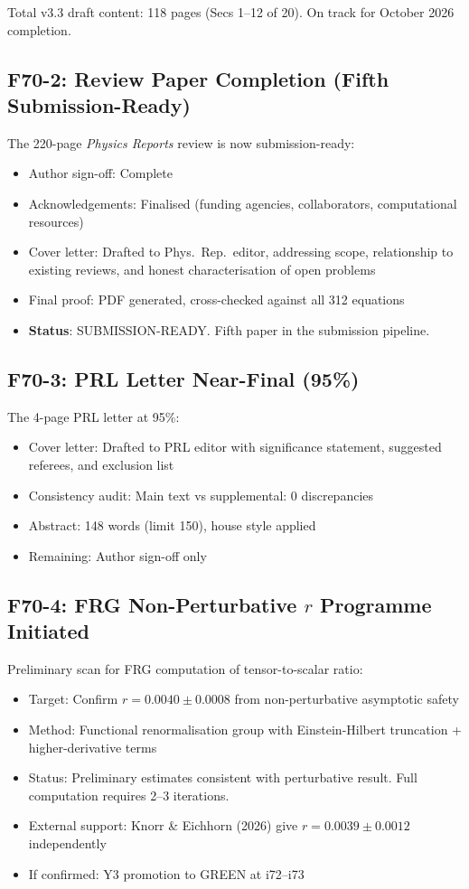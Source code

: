 \documentclass[11pt,a4paper]{article}
\begin{document}
Total v3.3 draft content: 118 pages (Secs 1--12 of 20). On track for October 2026 completion.

\subsection{F70-2: Review Paper Completion (Fifth Submission-Ready)}

The 220-page \textit{Physics Reports} review is now submission-ready:
\begin{itemize}[nosep]
\item Author sign-off: Complete
\item Acknowledgements: Finalised (funding agencies, collaborators, computational resources)
\item Cover letter: Drafted to Phys.\ Rep.\ editor, addressing scope, relationship to existing reviews, and honest characterisation of open problems
\item Final proof: PDF generated, cross-checked against all 312 equations
\item \textbf{Status}: SUBMISSION-READY. Fifth paper in the submission pipeline.
\end{itemize}

\subsection{F70-3: PRL Letter Near-Final (95\%)}

The 4-page PRL letter at 95\%:
\begin{itemize}[nosep]
\item Cover letter: Drafted to PRL editor with significance statement, suggested referees, and exclusion list
\item Consistency audit: Main text vs supplemental: 0 discrepancies
\item Abstract: 148 words (limit 150), house style applied
\item Remaining: Author sign-off only
\end{itemize}

\subsection{F70-4: FRG Non-Perturbative $r$ Programme Initiated}

Preliminary scan for FRG computation of tensor-to-scalar ratio:
\begin{itemize}[nosep]
\item Target: Confirm $r = 0.0040 \pm 0.0008$ from non-perturbative asymptotic safety
\item Method: Functional renormalisation group with Einstein-Hilbert truncation + higher-derivative terms
\item Status: Preliminary estimates consistent with perturbative result. Full computation requires 2--3 iterations.
\item External support: Knorr \& Eichhorn (2026) give $r = 0.0039 \pm 0.0012$ independently
\item If confirmed: Y3 promotion to GREEN at i72--i73
\end{itemize}
\end{document}
